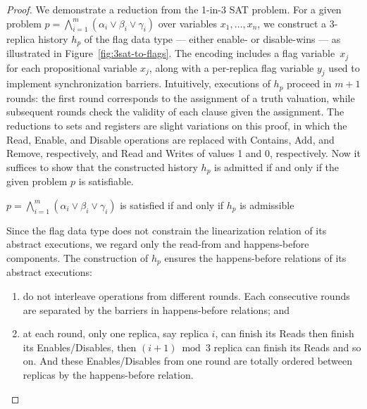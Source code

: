 \begin{proof}

  We demonstrate a reduction from the 1-in-3 SAT problem. For a given problem $p = \bigwedge_{i=1}^{m} (\alpha_i \lor \beta_i \lor \gamma_i)$ over variables $x_1, \ldots, x_n$, we construct a 3-replica history $h_p$ of the flag data type — either enable- or disable-wins — as illustrated in Figure~\ref{fig:3sat-to-flags}. The encoding includes a flag variable~$x_j$ for each propositional variable $x_j$, along with a per-replica flag variable $y_j$ used to implement synchronization barriers. Intuitively, executions of $h_p$ proceed in $m+1$ rounds: the first round corresponds to the assignment of a truth valuation, while subsequent rounds check the validity of each clause given the assignment. The reductions to sets and registers are slight variations on this proof, in which the \textrm{Read}, \textrm{Enable}, and \textrm{Disable} operations are replaced with \textrm{Contains}, \textrm{Add}, and \textrm{Remove}, respectively, and \textrm{Read} and \textrm{Writes} of values 1 and 0, respectively. Now it suffices to show that the constructed history $h_p$ is admitted if and only if the given problem $p$ is satisfiable.
  
  \begin{lemma}
    \label{crdt:flag:npc-proof:lemma3}
    $p = \bigwedge_{i=1}^{m} (\alpha_i \lor \beta_i \lor \gamma_i)$ is satisfied if and only if $h_p$ is admissible
  \end{lemma}
  
  Since the flag data type does not constrain the linearization relation of its abstract executions, we regard only the read-from and happens-before components. The construction of $h_p$ ensures the happens-before relations of its abstract executions:
  \vspace{-1.5mm}
  \begin{enumerate}

    \item do not interleave operations from different rounds. Each consecutive rounds are separated by the barriers in happens-before relations; and

    \item at each round, only one replica, say replica $i$, can finish its \textrm{Read}s then finish its \textrm{Enable}s/\textrm{Disable}s, then $(i+1) \bmod 3$ replica can finish its \textrm{Read}s and so on. And these \textrm{Enable}s/\textrm{Disable}s from one round are totally ordered between replicas by the happens-before relation.


\end{enumerate}
\end{proof}
